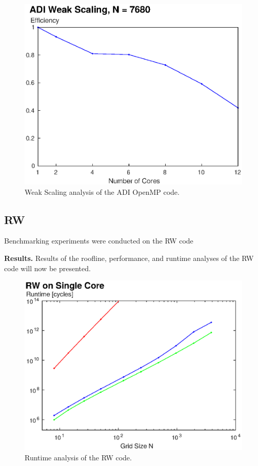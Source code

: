 \documentclass[letterpaper]{article}
\newcommand{\mypar}[1]{{\bf #1.}}
\begin{document}
\begin{figure}\centering
  \includegraphics[width=\linewidth]{./plots/scaling_weak_ADI_cropped.eps}
  \caption{Weak Scaling analysis of the ADI OpenMP code.}
  \label{fig:scaling_weak_ADI}
\end{figure}

\subsection{RW}\label{subsec:RW_results}
Benchmarking experiments were conducted on the RW code

\mypar{Results}
Results of the roofline, performance, and runtime analyses of the RW code will now be presented.

\begin{figure}\centering
  \includegraphics[width=\linewidth]{./plots/runtime_RW_cropped.eps}
  \caption{Runtime analysis of the RW code.}
  \label{fig:runtime_RW}
\end{figure}
\end{document}
